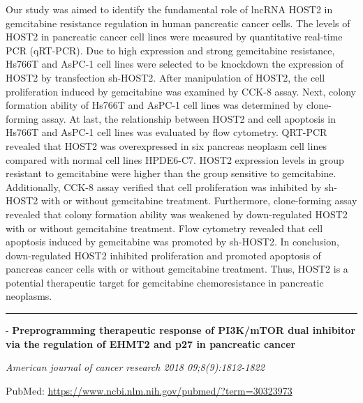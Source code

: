 \documentclass[]{article}
\begin{document}
Our study was aimed to identify the fundamental role of lncRNA HOST2 in
gemcitabine resistance regulation in human pancreatic cancer cells. The
levels of HOST2 in pancreatic cancer cell lines were measured by
quantitative real-time PCR (qRT-PCR). Due to high expression and strong
gemcitabine resistance, Hs766T and AsPC-1 cell lines were selected to be
knockdown the expression of HOST2 by transfection sh-HOST2. After
manipulation of HOST2, the cell proliferation induced by gemcitabine was
examined by CCK-8 assay. Next, colony formation ability of Hs766T and
AsPC-1 cell lines was determined by clone-forming assay. At last, the
relationship between HOST2 and cell apoptosis in Hs766T and AsPC-1 cell
lines was evaluated by flow cytometry. QRT-PCR revealed that HOST2 was
overexpressed in six pancreas neoplasm cell lines compared with normal
cell lines HPDE6-C7. HOST2 expression levels in group resistant to
gemcitabine were higher than the group sensitive to gemcitabine.
Additionally, CCK-8 assay verified that cell proliferation was inhibited
by sh-HOST2 with or without gemcitabine treatment. Furthermore,
clone-forming assay revealed that colony formation ability was weakened
by down-regulated HOST2 with or without gemcitabine treatment. Flow
cytometry revealed that cell apoptosis induced by gemcitabine was
promoted by sh-HOST2. In conclusion, down-regulated HOST2 inhibited
proliferation and promoted apoptosis of pancreas cancer cells with or
without gemcitabine treatment. Thus, HOST2 is a potential therapeutic
target for gemcitabine chemoresistance in pancreatic neoplasms.

{}

{}

\begin{center}\rule{0.5\linewidth}{\linethickness}\end{center}

 - \textbf{Preprogramming therapeutic response of PI3K/mTOR dual
inhibitor via the regulation of EHMT2 and p27 in pancreatic cancer}

\emph{American journal of cancer research 2018 09;8(9):1812-1822}

PubMed: \url{https://www.ncbi.nlm.nih.gov/pubmed/?term=30323973}
\end{document}
